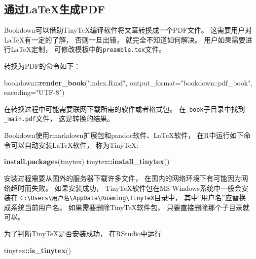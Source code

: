 \documentclass[
]{article}
\newenvironment{Shaded}{\begin{snugshade}}{\end{snugshade}}
\newcommand{\AttributeTok}[1]{\textcolor[rgb]{0.13,0.29,0.53}{#1}}
\newcommand{\FunctionTok}[1]{\textcolor[rgb]{0.13,0.29,0.53}{\textbf{#1}}}
\newcommand{\NormalTok}[1]{#1}
\newcommand{\SpecialCharTok}[1]{\textcolor[rgb]{0.81,0.36,0.00}{\textbf{#1}}}
\newcommand{\StringTok}[1]{\textcolor[rgb]{0.31,0.60,0.02}{#1}}
\begin{document}
\subsection{通过LaTeX生成PDF}\label{usage-pdfbook}

Bookdown可以借助TinyTeX编译软件将文章转换成一个PDF文件。
这需要用户对LaTeX有一定的了解，
否则一旦出错，
就完全不知道如何解决。
用户如果需要进行LaTeX定制，
可修改模板中的\texttt{preamble.tex}文件。

转换为PDF的命令如下：

\begin{Shaded}
\begin{Highlighting}[]
\NormalTok{bookdown}\SpecialCharTok{::}\FunctionTok{render\_book}\NormalTok{(}\StringTok{"index.Rmd"}\NormalTok{,}
  \AttributeTok{output\_format=}\StringTok{"bookdown::pdf\_book"}\NormalTok{, }\AttributeTok{encoding=}\StringTok{"UTF{-}8"}\NormalTok{)}
\end{Highlighting}
\end{Shaded}

在转换过程中可能需要联网下载所需的软件或者格式包。
在\texttt{\_book}子目录中找到\texttt{\_main.pdf}文件，
这是转换的结果。

Bookdown使用rmarkdown扩展包和pandoc软件、LaTeX软件，
在R中运行如下命令可以自动安装LaTeX软件，
称为TinyTeX:

\begin{Shaded}
\begin{Highlighting}[]
\FunctionTok{install.packages}\NormalTok{(}\StringTok{\textquotesingle{}tinytex\textquotesingle{}}\NormalTok{)}
\NormalTok{tinytex}\SpecialCharTok{::}\FunctionTok{install\_tinytex}\NormalTok{()}
\end{Highlighting}
\end{Shaded}

安装过程需要从国外的服务器下载许多文件，
在国内的网络环境下有可能因为网络超时而失败。
如果安装成功，
TinyTeX软件包在MS Windows系统中一般会安装在
\texttt{C:\textbackslash{}Users\textbackslash{}用户名\textbackslash{}AppData\textbackslash{}Roaming\textbackslash{}TinyTeX}目录中，
其中``用户名''应替换成系统当前用户名。
如果需要删除TinyTeX软件包，
只要直接删除那个子目录就可以。

为了判断TinyTeX是否安装成功，
在RStudio中运行

\begin{Shaded}
\begin{Highlighting}[]
\NormalTok{tinytex}\SpecialCharTok{::}\FunctionTok{is\_tinytex}\NormalTok{()}
\end{Highlighting}
\end{Shaded}
\end{document}

